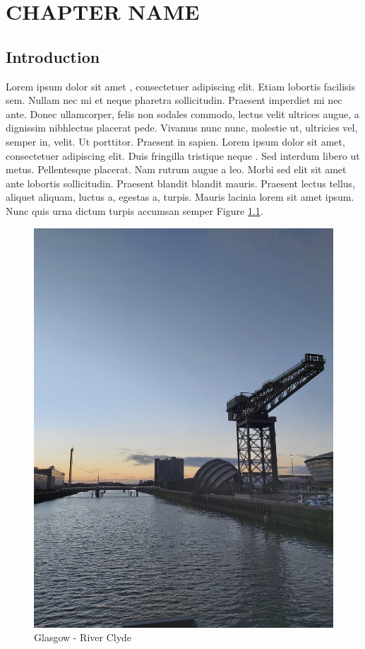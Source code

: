 \chapter{CHAPTER NAME}

\section{Introduction}

Lorem ipsum dolor sit amet \parencite{Scherman21}, consectetuer adipiscing elit. Etiam lobortis facilisis sem. Nullam nec mi et neque pharetra sollicitudin. Praesent imperdiet mi nec ante. Donec ullamcorper, felis non sodales commodo, lectus velit ultrices augue, a dignissim nibhlectus placerat pede. Vivamus nunc nunc, molestie ut, ultricies vel, semper in, velit. Ut porttitor. Praesent in sapien. Lorem ipsum dolor sit amet, consectetuer adipiscing elit. Duis fringilla tristique neque \parencite{Moreno95,Turner92}. Sed interdum libero ut metus. Pellentesque placerat. Nam rutrum augue a leo. Morbi sed elit sit amet ante lobortis sollicitudin. Praesent blandit blandit mauris. Praesent lectus tellus, aliquet aliquam, luctus a, egestas a, turpis. Mauris lacinia lorem sit amet ipsum. Nunc quis urna dictum turpis accumsan semper Figure \ref{fig:NAME}. 

\begin{figure}[ht]
    \centering
    \includegraphics[width=\linewidth,angle =-90]{chapter2/Glasgow.jpg}
    \caption{Glasgow - River Clyde}
    \label{fig:NAME}
\end{figure}
 

